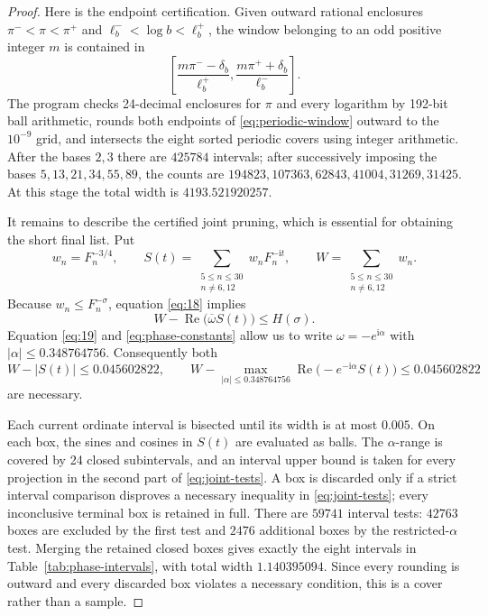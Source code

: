 \documentclass[11pt]{article}
\theoremstyle{remark}
\newcommand{\ii}{\mathrm{i}}
\newcommand{\real}{\operatorname{Re}}
\begin{document}
\begin{proof}
Here is the endpoint certification.  Given outward rational enclosures
$\pi^-<\pi<\pi^+$ and $\ell_b^-<\log b<\ell_b^+$, the window belonging to
an odd positive integer $m$ is contained in
\begin{equation}\label{eq:periodic-window}
 \left[
   \frac{m\pi^- -\delta_b}{\ell_b^+},
   \frac{m\pi^+ +\delta_b}{\ell_b^-}
 \right].
\end{equation}
The program checks 24-decimal enclosures for $\pi$ and every logarithm by
192-bit ball arithmetic, rounds both endpoints of \eqref{eq:periodic-window}
outward to the $10^{-9}$ grid, and intersects the eight sorted periodic
covers using integer arithmetic.  After the bases $2,3$ there are $425784$
intervals; after successively imposing the bases $5,13,21,34,55,89$, the
counts are $194823,107363,62843,41004,31269,31425$.  At this stage the total
width is $4193.521920257$.

It remains to describe the certified joint pruning, which is essential for
obtaining the short final list.  Put
\[
 w_n=F_n^{-3/4},\qquad
 S(t)=\sum_{\substack{5\leq n\leq30\\n\neq6,12}}w_nF_n^{-\ii t},
 \qquad W=\sum_{\substack{5\leq n\leq30\\n\neq6,12}}w_n.
\]
Because $w_n\leq F_n^{-\sigma}$, equation \eqref{eq:18} implies
\begin{equation}\label{eq:joint-necessary}
 W-\real\bigl(\overline\omega S(t)\bigr)\leq H(\sigma).
\end{equation}
Equation \eqref{eq:19} and \eqref{eq:phase-constants} allow us to write
$\omega=-e^{\ii\alpha}$ with
$|\alpha|\leq0.348764756$.  Consequently both
\begin{equation}\label{eq:joint-tests}
 W-|S(t)|\leq0.045602822,
 \qquad
 W-\max_{|\alpha|\leq0.348764756}
 \real\bigl(-e^{-\ii\alpha}S(t)\bigr)\leq0.045602822
\end{equation}
are necessary.

Each current ordinate interval is bisected until its width is at most
$0.005$.  On each box, the sines and cosines in $S(t)$ are evaluated as
balls.  The $\alpha$-range is covered by 24 closed subintervals, and an
interval upper bound is taken for every projection in the second part of
\eqref{eq:joint-tests}.  A box is discarded only if a strict interval
comparison disproves a necessary inequality in \eqref{eq:joint-tests}; every
inconclusive terminal box is retained in full.  There are $59741$ interval
tests: $42763$ boxes are excluded by the first test and $2476$ additional
boxes by the restricted-$\alpha$ test.  Merging the retained closed boxes
gives exactly the eight intervals in Table~\ref{tab:phase-intervals}, with
total width $1.140395094$.  Since every rounding is outward and every
discarded box violates a necessary condition, this is a cover rather than a
sample.
\end{proof}
\end{document}
